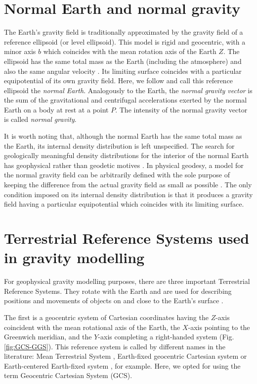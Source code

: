 \documentclass[extra]{gji}
\begin{document}
\section{Normal Earth and normal gravity}

The Earth's gravity field is traditionally approximated
by the gravity field of a reference ellipsoid (or level ellipsoid).
This model is rigid and geocentric,
with a minor axis $b$ which coincides with
the mean rotation axis of the Earth $Z$.
The ellipsoid has the same total mass as the Earth (including the atmosphere)
and also the same angular velocity \citep{heiskanen-moritz1967,
vanicek1987,hofmann-wellenhof-moritz2005,torge2012}.
Its limiting surface coincides with
a particular equipotential of its own gravity field.
Here, we follow \citep{torge2012} and call this reference ellipsoid
the \textit{normal Earth}.
Analogously to the Earth, the \textit{normal gravity vector} is
the sum of the
gravitational and centrifugal accelerations exerted by the normal
Earth on a body at rest at a point $P$.
The intensity of the normal gravity vector is called \textit{normal gravity}.

It is worth noting that, although the normal Earth has the same total mass as
the Earth, its internal density distribution is left unspecified.
The search for geologically meaningful density distributions
for the interior of the normal Earth has
geophysical rather than geodetic motives \citep{marussi1974}.
In physical geodesy, a model for the normal gravity field
can be arbitrarily defined with the sole purpose of
keeping the difference from the actual gravity field
as small as possible \citep{vanicek1987}.
The only condition imposed on its internal density
distribution is that it produces a gravity field
having a particular equipotential which coincides
with its limiting surface.


\section{Terrestrial Reference Systems used in gravity modelling}

For geophysical gravity modelling purposes, there are three important
Terrestrial Reference Systems.
They rotate with the Earth and are used for describing
positions and movements of objects on and close to the Earth's surface
\citep{torge2012}.

The first is a geocentric system of Cartesian coordinates
having the $Z$-axis coincident with the mean rotational axis of the Earth,
the $X$-axis pointing to the Greenwich meridian,
and the $Y$-axis completing a right-handed system (Fig. \ref{fig:GCS-GGS}).
This reference system is called by different names in the literature:
Mean Terrestrial System \citep[e.g.,][]{soler1976},
Earth-fixed geocentric Cartesian system \citep[e.g.,][]{torge2012}
or Earth-centered Earth-fixed system \citep[e.g.,][]{bouman_etal2013},
for example.
Here, we opted for using the term Geocentric Cartesian System (GCS).
\end{document}
